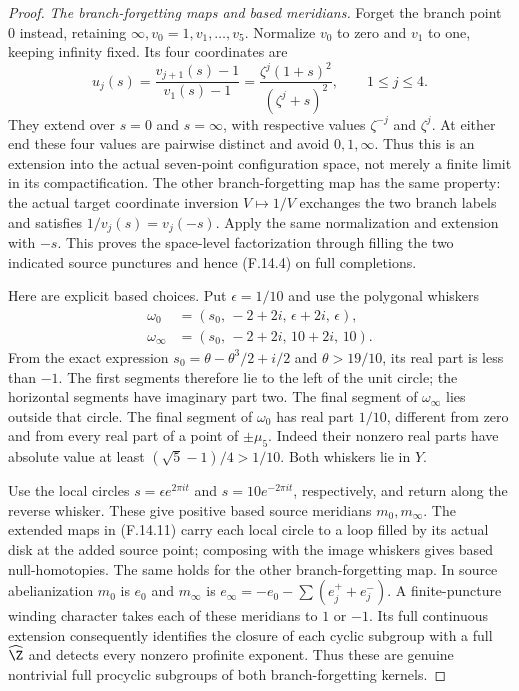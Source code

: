 \begin{proof}
\emph{The branch-forgetting maps and based meridians.}
Forget the branch point $0$ instead, retaining
$\infty,v_0=1,v_1,\ldots,v_5$.
Normalize $v_0$ to zero and $v_1$ to one, keeping
infinity fixed.  Its four coordinates are
\[
 u_j(s)=\frac{v_{j+1}(s)-1}{v_1(s)-1}
       =\frac{\zeta^j(1+s)^2}{(\zeta^j+s)^2},
                \qquad 1\le j\le4.
                                                               \tag{F.14.11}
\]
They extend over $s=0$ and $s=\infty$, with respective
values $\zeta^{-j}$ and $\zeta^j$.  At either end
these four values are pairwise distinct and avoid
$0,1,\infty$.  Thus this is an extension into the
actual seven-point configuration space, not merely
a finite limit in its compactification.
The other branch-forgetting map has the same
property: the actual target coordinate inversion
$V\mapsto1/V$ exchanges the two branch labels and
satisfies $1/v_j(s)=v_j(-s)$.  Apply the same
normalization and extension with $-s$.
This proves the space-level factorization through
filling the two indicated source punctures and
hence (F.14.4) on full completions.

Here are explicit based choices.  Put
$\epsilon=1/10$ and use the polygonal whiskers
\[
 \begin{split}
 \omega_0&=(s_0,\,-2+2i,\,\epsilon+2i,\,\epsilon),\\
 \omega_\infty&=(s_0,\,-2+2i,\,10+2i,\,10).
 \end{split}                                                   \tag{F.14.12}
\]
From the exact expression
$s_0=\theta-\theta^3/2+i/2$ and $\theta>19/10$,
its real part is less than $-1$.
The first segments therefore lie to the left of
the unit circle; the horizontal segments have
imaginary part two.  The final segment of
$\omega_\infty$ lies outside that circle.
The final segment of $\omega_0$ has real part
$1/10$, different from zero and from every real
part of a point of $\pm\mu_5$.  Indeed their
nonzero real parts have absolute value at least
$(\sqrt5-1)/4>1/10$.
Both whiskers lie in $Y$.

Use the local circles
$s=\epsilon e^{2\pi i t}$ and $s=10e^{-2\pi i t}$,
respectively, and return along the reverse
whisker.  These give positive based source
meridians $m_0,m_\infty$.
The extended maps in (F.14.11) carry each local
circle to a loop filled by its actual disk
at the added source point; composing with the
image whiskers gives based null-homotopies.
The same holds for the other branch-forgetting
map.
In source abelianization $m_0$ is $e_0$ and
$m_\infty$ is $e_\infty=-e_0-\sum(e_j^++e_j^-)$.
A finite-puncture winding character takes each
of these meridians to $1$ or $-1$.
Its full continuous extension consequently
identifies the closure of each cyclic subgroup
with a full $\widehat\Z$ and detects every nonzero
profinite exponent.  Thus these are genuine
nontrivial full procyclic subgroups of both
branch-forgetting kernels.


\end{proof}
